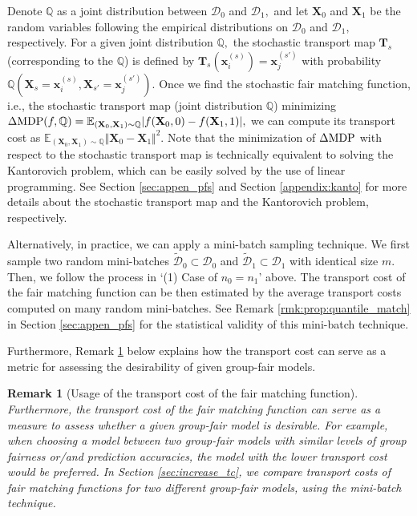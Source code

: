 \documentclass[10pt]{article} %
\newtheorem{remark}[theorem]{Remark}
\begin{document}
\begin{enumerate}
    Denote $\mathbb{Q}$ as a joint distribution between $\mathcal{D}_{0}$ and $\mathcal{D}_{1},$ and let $\mathbf{X}_{0}$ and $\mathbf{X}_{1}$ be the random variables following the empirical distributions on $\mathcal{D}_{0}$ and $\mathcal{D}_{1},$ respectively.
    For a given joint distribution $\mathbb{Q},$ the stochastic transport map $\mathbf{T}_{s}$ (corresponding to the $\mathbb{Q}$) is defined by $\mathbf{T}_{s}(\mathbf{x}_{i}^{(s)}) = \mathbf{x}_{j}^{(s')}$ with probability $\mathbb{Q}(\mathbf{X}_{s} = \mathbf{x}_{i}^{(s)}, \mathbf{X}_{s'} = \mathbf{x}_{j}^{(s')}).$
    Once we find the stochastic fair matching function, i.e., the stochastic transport map (joint distribution $\mathbb{Q}$) minimizing $\Delta \textup{MDP}(f, \mathbb{Q}) = \mathbb{E}_{(\mathbf{X}_{0}, \mathbf{X}_{1}) \sim \mathbb{Q}} \vert f(\mathbf{X}_{0}, 0) - f(\mathbf{X}_{1}, 1) \vert,$ we can compute its transport cost as $\mathbb{E}_{(\mathbf{X}_{0}, \mathbf{X}_{1}) \sim \mathbb{Q}} \Vert \mathbf{X}_{0} - \mathbf{X}_{1} \Vert^{2}.$
    Note that the minimization of $\Delta \textup{MDP}$ with respect to the stochastic transport map is technically equivalent to solving the Kantorovich problem, which can be easily solved by the use of linear programming.
    See Section \ref{sec:appen_pfs} and Section \ref{appendix:kanto} for more details about the stochastic transport map and the Kantorovich problem, respectively.
    
    Alternatively, in practice, we can apply a mini-batch sampling technique.
    We first sample two random mini-batches $\tilde{\mathcal{D}}_{0} \subset \mathcal{D}_{0}$ and $\tilde{\mathcal{D}}_{1} \subset \mathcal{D}_{1}$ with identical size $m.$
    Then, we follow the process in `(1) Case of $n_{0} = n_{1}$' above.
    The transport cost of the fair matching function can be then estimated by the average transport costs computed on many random mini-batches.
    See Remark \ref{rmk:prop:quantile_match} in Section \ref{sec:appen_pfs} for the statistical validity of this mini-batch technique.
\end{enumerate}

Furthermore, Remark \ref{rmk:use_tc} below explains how the transport cost can serve as a metric for assessing the desirability of given group-fair models.

\begin{remark}[Usage of the transport cost of the fair matching function]\label{rmk:use_tc}
    Furthermore, the transport cost of the fair matching function can serve as a measure to assess whether a given group-fair model is desirable.
    For example, when choosing a model between two group-fair models with similar levels of group fairness or/and prediction accuracies, the model with the lower transport cost would be preferred.
    In Section \ref{sec:increase_tc}, we compare transport costs of fair matching functions for two different group-fair models, using the mini-batch technique.
\end{remark}
\end{document}
